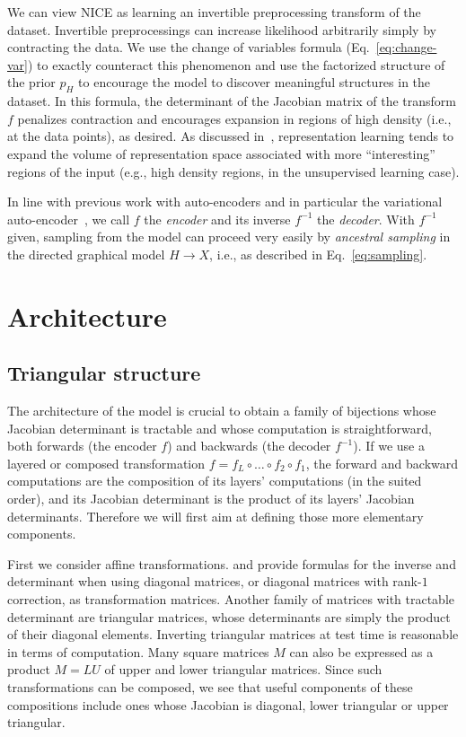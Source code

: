 \documentclass{article}
\begin{document}
We can view NICE as learning an invertible preprocessing transform of the dataset.
Invertible preprocessings can increase likelihood arbitrarily simply 
by contracting the data.  We use the change of variables formula 
(Eq.~\ref{eq:change-var}) to exactly counteract this phenomenon and use
the factorized structure of the prior $p_H$ to encourage 
the model to discover meaningful structures in the dataset.
In this formula, the determinant of the Jacobian matrix of the transform 
$f$ penalizes contraction and encourages expansion in regions of high density
(i.e., at the data points), as desired.  As discussed in~\citet{Bengio-et-al-ICML2013},
representation learning tends to expand the volume of representation space associated
with more ``interesting'' regions of the input (e.g., high density regions,
in the unsupervised learning case).





In line with previous work with auto-encoders and in particular
the variational auto-encoder~\citep{Kingma+Welling-ICLR2014,
Rezende-et-al-arxiv2014,Mnih+Gregor-ICML2014,Gregor-et-al-ICML2014}, 
we call $f$ the {\em encoder} and its inverse $f^{-1}$
the {\em decoder}. With $f^{-1}$ given, sampling from the model can proceed very easily
by {\em ancestral sampling} in the directed graphical model $H \rightarrow X$, i.e.,
as described in Eq.~\ref{eq:sampling}.



\section{Architecture}
\subsection{Triangular structure}
The architecture of the model is crucial to obtain
a family of bijections whose Jacobian determinant is tractable and whose computation
is straightforward, both forwards (the encoder $f$) and backwards (the decoder $f^{-1}$).
If we use a layered or composed transformation $f = f_L \circ \ldots \circ f_2 \circ f_1$, the
forward and backward computations are the composition of its layers' computations (in the suited order),
and its Jacobian determinant
is the product of
its layers' Jacobian determinants. Therefore we will first aim at
defining those more elementary components.

First we consider affine transformations.
\citep{Rezende-et-al-arxiv2014} and \citep{Kingma+Welling-ICLR2014} provide
formulas for the inverse and determinant when using diagonal matrices, or diagonal
matrices with rank-$1$ correction, as transformation matrices. Another
family of matrices with tractable determinant are triangular
matrices, whose determinants are simply the product of their
diagonal elements. Inverting triangular matrices at test time is 
reasonable in terms of computation. Many square matrices $M$ can also be expressed as a product $M = LU$ of upper
and lower triangular matrices. Since such transformations can be composed,
we see that useful components of these compositions include ones whose
Jacobian is diagonal, lower triangular or upper triangular.
\end{document}
